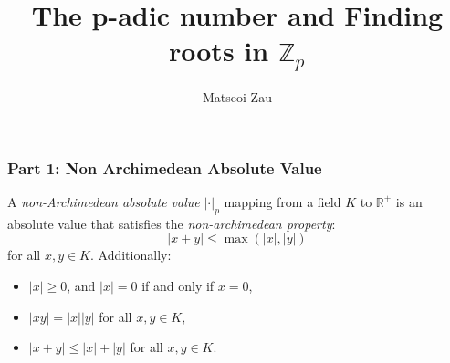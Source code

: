 \documentclass{beamer}
\newcommand{\Z}{\mathbb{Z}}
\begin{document}
\title[The p-adic number and its application]{The p-adic number and Finding roots in $\Z_p$}
\author{Matseoi Zau}
\frame{\titlepage}




\begin{frame}
    \begin{definition}
    \frametitle{Part 1: Non Archimedean Absolute Value}
        A \textit{non-Archimedean absolute value} \( |\cdot|_p \) mapping from a field \( K \) to \( \mathbb{R}^+ \)  is an absolute value that satisfies the \textit{non-archimedean property}:
        \[
            |x + y| \leq \max(|x|, |y|)
        \]
        for all \( x, y \in K \). Additionally:
        \begin{itemize}
            \item \( |x| \geq 0 \), and \( |x| = 0 \) if and only if \( x = 0 \),
            \item \( |xy| = |x| |y| \) for all \( x, y \in K \),
            \item \( |x+y| \leq |x|+|y| \) for all \( x, y \in K \).
        \end{itemize}
    \end{definition}
\end{frame}
\end{document}
